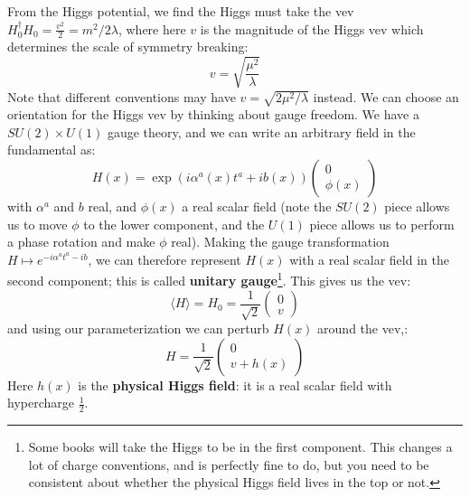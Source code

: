 \documentclass[11pt, oneside]{article}   	%
\theoremstyle{definition}
\numberwithin{equation}{subsection}		%
\begin{document}
From the Higgs potential, we find the Higgs must take the vev $H_0^\dagger H_0 = \frac{v^2}{2} = m^2 / 2\lambda$, where 
here $v$ is the magnitude of the Higgs vev which determines the scale of symmetry breaking:
\begin{equation}
	v = \sqrt{\frac{\mu^2}{\lambda}}
\end{equation}
Note that different conventions may have $v = \sqrt{2\mu^2 / \lambda}$ instead. We can choose an orientation for the Higgs vev 
by thinking about gauge freedom. We have a $SU(2)\times U(1)$ gauge theory, and we can write an arbitrary field in the fundamental 
as:
\begin{equation}
	H(x) = \exp\left( i\alpha^a(x) t^a + i b(x)\right)\begin{pmatrix} 0 \\ \phi(x) \end{pmatrix}
\end{equation}
with $\alpha^a$ and $b$ real, and $\phi(x)$ a real scalar field (note the $SU(2)$ piece allows us to move $\phi$ to the lower component, and 
the $U(1)$ piece allows us to perform a phase rotation and make $\phi$ real). Making the gauge transformation $H\mapsto e^{-i\alpha^a t^a - ib}$, we 
can therefore represent $H(x)$ with a real scalar field in the second component; this is called \textbf{unitary gauge}\footnote{Some books will take the 
Higgs to be in the first component. This changes a lot of charge conventions, and is perfectly fine to do, but you need to be consistent about 
whether the physical Higgs field lives in the top or not.}. This gives us the vev:
\begin{equation}
	\langle H \rangle = H_0 = \frac{1}{\sqrt 2}\begin{pmatrix} 0 \\ v \end{pmatrix}
\end{equation}
and using our parameterization we can perturb $H(x)$ around the vev,:
\begin{equation}
	H = \frac{1}{\sqrt 2} \begin{pmatrix} 0 \\ v + h(x)\end{pmatrix}
\end{equation}
Here $h(x)$ is the \textbf{physical Higgs field}: it is a real scalar field with hypercharge $\frac{1}{2}$. 
\end{document}
